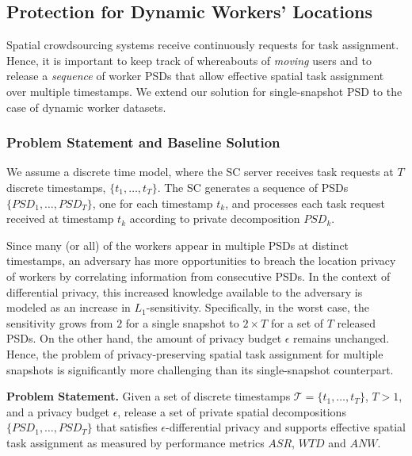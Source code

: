 \documentclass{USC-Thesis}
\renewcommand\bf\bfseries  %
\numberwithin{equation}{chapter}
\begin{document}
\subsection{Protection for Dynamic Workers' Locations}
\label{sec:psd_dynamic}

Spatial crowdsourcing systems receive continuously requests for task assignment. Hence, it is important to keep track of whereabouts of {\em moving} users and to release a {\em sequence} of worker PSDs that allow effective spatial task assignment over multiple timestamps. We extend our solution for single-snapshot PSD to the case of dynamic worker datasets.

\subsubsection{Problem Statement and Baseline Solution}
We assume a discrete time model, where the SC server receives task requests at $T$ discrete timestamps, $\{t_1, \ldots, t_T\}$. The SC generates a sequence of PSDs $\{PSD_1, \ldots, PSD_T\}$, one for each timestamp $t_k$, and processes each task request received at timestamp $t_k$ according to private decomposition $PSD_k$.

Since many (or all) of the workers appear in multiple PSDs at distinct timestamps, an adversary has more opportunities to breach the location privacy of workers by correlating information from consecutive PSDs. In the context of differential privacy, this increased knowledge available to the adversary is modeled as an increase in $L_1$-sensitivity. Specifically, in the worst case, the sensitivity grows from $2$ for a single snapshot to $2 \times T$ for a set of $T$ released PSDs. On the other hand, the amount of privacy budget $\epsilon$ remains unchanged. Hence, the problem of privacy-preserving spatial task assignment for multiple snapshots is significantly more challenging than its single-snapshot counterpart. 

\noindent
{\bf Problem Statement.} Given a set of discrete timestamps $\mathcal{T} = \{t_1, \ldots, t_T\}$, $T>1$, and a privacy budget $\epsilon$, release a set of private spatial decompositions $\{PSD_1, \ldots, PSD_T\}$ that satisfies $\epsilon$-differential privacy and supports effective spatial task assignment as measured by performance metrics $\mathit{ASR}$, $\mathit{WTD}$ and $\mathit{ANW}$.
\end{document}
